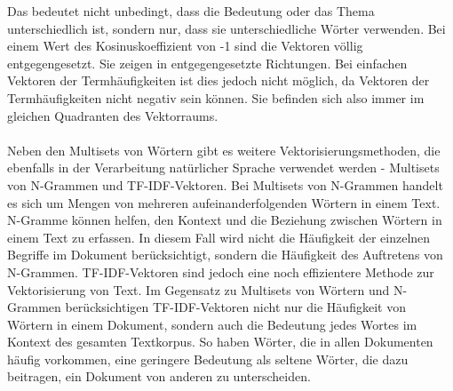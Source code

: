 Das bedeutet nicht unbedingt, dass die Bedeutung oder das Thema unterschiedlich ist, sondern nur, dass sie unterschiedliche Wörter verwenden. 
Bei einem Wert des Kosinuskoeffizient von -1 sind die Vektoren völlig entgegengesetzt. 
Sie zeigen in entgegengesetzte Richtungen. 
Bei einfachen Vektoren der Termhäufigkeiten ist dies jedoch nicht möglich, da Vektoren der Termhäufigkeiten nicht negativ sein können. 
Sie befinden sich also immer im gleichen Quadranten des Vektorraums.\\\\
Neben den Multisets von Wörtern gibt es weitere Vektorisierungsmethoden, die ebenfalls in der Verarbeitung natürlicher Sprache verwendet werden - Multisets von N-Grammen und \ac{TF-IDF}-Vektoren.
Bei Multisets von N-Grammen handelt es sich um Mengen von mehreren aufeinanderfolgenden Wörtern in einem Text. 
N-Gramme können helfen, den Kontext und die Beziehung zwischen Wörtern in einem Text zu erfassen. 
In diesem Fall wird nicht die Häufigkeit der einzelnen Begriffe im Dokument berücksichtigt, sondern die Häufigkeit des Auftretens von N-Grammen.
\ac{TF-IDF}-Vektoren sind jedoch eine noch effizientere Methode zur Vektorisierung von Text. 
Im Gegensatz zu Multisets von Wörtern und N-Grammen berücksichtigen \ac{TF-IDF}-Vektoren nicht nur die Häufigkeit von Wörtern in einem Dokument, sondern auch die Bedeutung jedes Wortes im Kontext des gesamten Textkorpus. 
So haben Wörter, die in allen Dokumenten häufig vorkommen, eine geringere Bedeutung als seltene Wörter, die dazu beitragen, ein Dokument von anderen zu unterscheiden.
